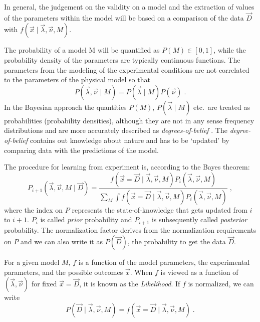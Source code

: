 In general, the judgement on the validity on a model and the extraction of values of the parameters within the model will be based on a comparison of the data $\vec{D}$ with $f(\vec{x}\mid\vec{\lambda},\vec{\nu},M)$.

 The probability of a model M will be quantified as $P(M)\in[0,1]$, while the probability density of the parameters are typically continuous functions. The parameters from the modeling of the experimental conditions are not correlated to the parameters of the physical model so that
\begin{equation}P(\vec{\lambda},\vec{\nu}\mid M)=P(\vec{\lambda}\mid M)P(\vec{\nu})\;.\end{equation}
In the Bayesian approach the quantities $P(M)$, $P(\vec{\lambda}\mid M)$ etc.~are treated as probabilities (probability densities), although they are not in any sense frequency distributions and are more accurately described as \emph{degrees-of-belief} \cite{bayesbook}. The \emph{degree-of-belief} contains out knowledge about nature and has to be `updated' by comparing data with the predictions of the model.

The procedure for learning from experiment is, according to the Bayes theorem:
\begin{equation}P_{i+1}(\vec{\lambda},\vec{\nu},M\mid\vec{D})=\frac{f(\vec{x}=\vec{D}\mid\vec{\lambda},\vec{\nu},M)P_i(\vec{\lambda},\vec{\nu},M)}{\sum_M\int f(\vec{x}=\vec{D}\mid\vec{\lambda},\vec{\nu},M)P_i(\vec{\lambda},\vec{\nu},M)}\;,\end{equation}
where the index on $P$ represents the state-of-knowledge that gets updated from $i$ to $i+1$. $P_i$ is called \emph{prior} probability and $P_{i+1}$ is subsequently called \emph{posterior} probability. The normalization factor derives from the normalization requirements on $P$ and we can also write it as $P(\vec{D})$, the probability to get the data $\vec{D}$.

For a given model $M$, $f$ is a function of the model parameters, the experimental parameters, and the possible outcomes $\vec{x}$. When $f$ is viewed as a function of $(\vec{\lambda},\vec{\nu})$ for fixed $\vec{x}=\vec{D}$, it is known as the \textit{Likelihood}. If $f$ is normalized, we can write
\begin{equation}P(\vec{D}\mid\vec{\lambda},\vec{\nu},M)=f(\vec{x}=\vec{D}\mid\vec{\lambda},\vec{\nu},M)\;.\end{equation}

